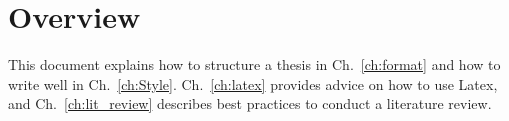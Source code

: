 \section{Overview}
This document explains how to structure a thesis in Ch.~\ref{ch:format} and how to write well in Ch.~\ref{ch:Style}. Ch.~\ref{ch:latex} provides advice on how to use Latex, and Ch.~\ref{ch:lit_review} describes best practices to conduct a literature review.







